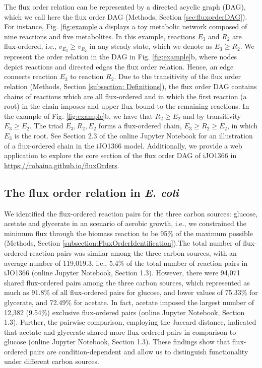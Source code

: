 \documentclass[12pt]{article}
\begin{document}
The flux order relation can be represented by a directed acyclic graph (DAG), which we call here the flux order DAG (Methods, Section \ref{sec:fluxorderDAG}). For instance, Fig. \ref{fig:example}a displays a toy metabolic network composed of nine reactions and five metabolites. In this example, reactions $E_3$ and $R_2$ are flux-ordered, i.e., $v_{E_3} \geq v_{R_2}$ in any steady state, which we denote as $E_3 \geq R_2$. We represent the order relation in the DAG in Fig. \ref{fig:example}b, where nodes depict reactions and directed edges the flux order relation. Hence, an edge connects reaction $E_3$ to reaction $R_2$. Due to the transitivity of the flux order relation (Methods, Section \ref{subsection: Definitions}), the flux order DAG contains chains of reactions which are all flux-ordered and in which the first reaction (a root) in the chain imposes and upper flux bound to the remaining reactions. In the example of Fig. \ref{fig:example}b, we have that $R_2 \geq E_2$ and by transitivity $E_3 \geq E_2$. The triad $E_3, R_2, E_2$ forms a flux-ordered chain, $E_3 \geq R_2 \geq E_2$, in which $E_3$ is the root. See Section 2.3 of the online Jupyter Notebook for an illustration of a flux-ordered chain in the iJO1366 model. Additionally, we provide a web application to explore the core section of the flux order DAG of iJO1366 in \url{https://robaina.github.io/fluxOrders}.

\subsection{The flux order relation in \emph{E. coli}}
\label{subsection: FluxOrderRelation}
We identified the flux-ordered reaction pairs for the three carbon sources: glucose, acetate and glycerate {\color{blue} in an scenario of aerobic growth, i.e., we constrained the minimum flux through the biomass reaction to be 95\% of the maximum possible} (Methods, Section \ref{subsection:FluxOrderIdentification}).The total number of flux-ordered reaction pairs was similar among the three carbon sources, with an average number of 119,019.3, i.e., 5.4\% of the total number of reaction pairs in iJO1366 (online Jupyter Notebook, Section 1.3). However, there were 94,071 shared flux-ordered pairs among the three carbon sources, which represented as much as 91.8\% of all flux-ordered pairs for glucose, and lower values of 75.33\% for glycerate, and 72.49\% for acetate. In fact, acetate imposed the largest number of 12,382 (9.54\%) exclusive flux-ordered pairs (online Jupyter Notebook, Section 1.3). Further, the pairwise comparison, employing the Jaccard distance, indicated that acetate and glycerate shared more flux-ordered pairs in comparison to glucose (online Jupyter Notebook, Section 1.3). These findings show that flux-ordered pairs are condition-dependent and allow us to distinguish functionality under different carbon sources.
\end{document}
